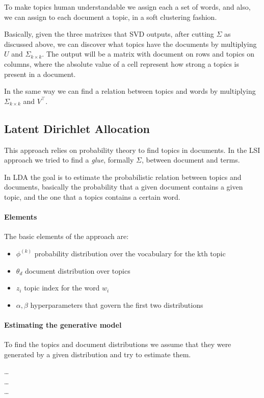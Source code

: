 To make topics human understandable 
we assign each a set of words, and also, we can assign to each 
document a topic, in a soft clustering fashion.

Basically, given the three matrixes that SVD outputs, after 
cutting $\Sigma$ as discussed above,   
we can discover what topics have the documents by multiplying 
$U$ and $\Sigma_{k \times k}$. The output will be a matrix with document 
on rows and topics on columns, where the absolute value of 
a cell represent how strong a topics is present in a document.

In the same way we can find a relation between topics and words 
by multiplying $\Sigma_{k \times k}$ and $V^\top$.

\subsection{Latent Dirichlet Allocation}
This approach relies on probability theory to find topics
in documents. 
In the LSI approach we tried to find a \emph{glue}, formally $\Sigma$,
between document and terms.

In LDA the goal is to estimate the probabilistic relation 
between topics and documents, basically the probability that 
a given document contains a given topic, and the one that 
a topics contains a certain word.

\paragraph{Elements}
The basic elements of the approach are:
\begin{itemize}
    \item $\phi^{(k)}$ probability distribution over the vocabulary 
    for the kth topic
    \item $\theta_d$ document distribution over topics
    \item $z_i$ topic index for the word $w_i$
    \item $\alpha, \beta$ hyperparameters that govern the first 
    two distributions
\end{itemize}

\paragraph{Estimating the generative model}
To find the topics and document distributions we 
assume that they were generated by a given distribution
and try to estimate them.

\dots\\
\dots\\
\dots
